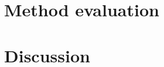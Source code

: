 \section{Method evaluation}                     \label{Chapter:PMLSM design RSM/method evaluation}


\section{Discussion}                            \label{Chapter:PMLSM design RSM/discussion}